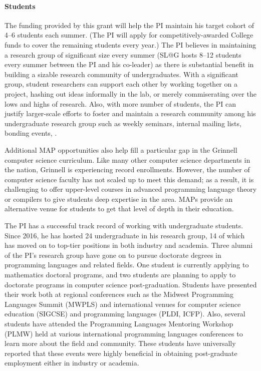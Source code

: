 \documentclass[11pt]{article}
\begin{document}
\paragraph{Students}
The funding provided by this grant will help the PI maintain his target cohort of 4--6 students each summer.
(The PI will apply for competitively-awarded College funds to cover the remaining students every year.)
The PI believes in maintaining a research group of significant size every summer (SL@G hosts 8--12 students every summer between the PI and his co-leader) as there is substantial benefit in building a sizable research community of undergraduates.
With a significant group, student researchers can support each other by working together on a project, hashing out ideas informally in the lab, or merely commiserating over the lows and highs of research.
Also, with more number of students, the PI can justify larger-scale efforts to foster and maintain a research community among his undergraduate research group such as weekly seminars, internal mailing lists, bonding events, \etc.

Additional MAP opportunities also help fill a particular gap in the Grinnell computer science curriculum.
Like many other computer science departments in the nation, Grinnell is experiencing record enrollments.
However, the number of computer science faculty has not scaled up to meet this demand; as a result, it is challenging to offer upper-level courses in advanced programming language theory or compilers to give students deep expertise in the area.
MAPs provide an alternative venue for students to get that level of depth in their education.

The PI has a successful track record of working with undergraduate students.
Since 2016, he has hosted 24 undergraduate in his research group, 14 of which has moved on to top-tier positions in both industry and academia.
Three alumni of the PI's research group have gone on to pursue doctorate degrees in programming languages and related fields.
One student is currently applying to mathematics doctoral programs, and two students are planning to apply to doctorate programs in computer science post-graduation.
Students have presented their work both at regional conferences such as the Midwest Programming Languages Summit (MWPLS) and international venues for computer science education (SIGCSE) and programming languages (PLDI, ICFP).
Also, several students have attended the Programming Languages Mentoring Workshop (PLMW) held at various international programming languages conferences to learn more about the field and community.
These students have universally reported that these events were highly beneficial in obtaining post-graduate employment either in industry or academia.
\end{document}
